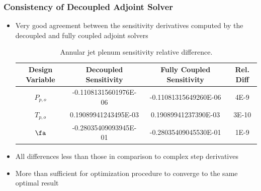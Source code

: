 \documentclass{beamer}
\begin{document}
\begin{frame}
  \frametitle{Consistency of Decoupled Adjoint Solver}
  \begin{itemize}
    \item Very good agreement between the sensitivity derivatives computed by
      the decoupled and fully coupled adjoint solvers
\begin{table}[h]
  \tiny
  \centering
  \begin{tabular}{c|c|c|c}
    Design Variable & Decoupled Sensitivity & Fully Coupled Sensitivity & Rel. Diff\\
    \hline
    $P_{p,o}$ & -0.11081315601976E-06 & -0.11081315649260E-06 & 4E-9  \\
    $T_{p,o}$ &  0.19089941243495E-03 &  0.19089941237390E-03 & 3E-10 \\
    $\fa$     & -0.28035409093945E-01 & -0.28035409045530E-01 & 1E-9
  \end{tabular}
  \caption{Annular jet plenum sensitivity relative difference.}
\end{table}
    \item All differences less than those in comparison to complex step derivatives
    \item More than sufficient for optimization procedure to converge to the
      same optimal result
  \end{itemize}
\end{frame}
\end{document}
